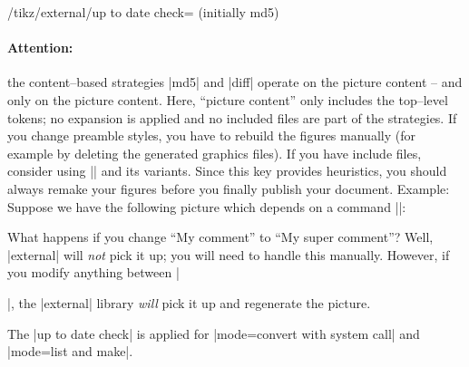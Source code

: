 {\begin{key}{/tikz/external/up to date check= (initially md5)}
    \paragraph{Attention:}
    the content--based strategies |md5| and |diff| operate on the picture
    content -- and only on the picture content. Here, ``picture content'' only
    includes the top--level tokens; no expansion is applied and no included
    files are part of the strategies. If you change preamble styles, you have
    to rebuild the figures manually (for example by deleting the generated
    graphics files). If you have include files, consider using
    |\tikzpicturedependsonfile| and its variants. Since this key provides
    heuristics, you should always remake your figures before you finally
    publish your document. Example: Suppose we have the following picture which
    depends on a command |\mycommand|:
\begin{codeexample}
\def\mycommand{My comment}

\end{codeexample}
    What happens if you change ``My comment'' to ``My super comment''? Well,
    |external| will \emph{not} pick it up; you will need to handle this
    manually. However, if you modify anything between ||, the |external| library \emph{will} pick it up and
    regenerate the picture.

    The |up to date check| is applied for |mode=convert with system call| and
    |mode=list and make|.
\end{key}


}
